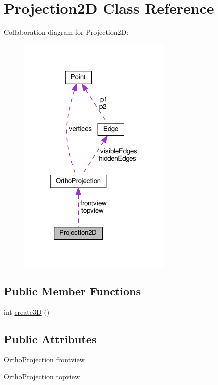 \hypertarget{class_projection2_d}{}\section{Projection2D Class Reference}
\label{class_projection2_d}


Collaboration diagram for Projection2D\+:
\nopagebreak
\begin{figure}[H]
\begin{center}
\leavevmode
\includegraphics[width=211pt]{class_projection2_d__coll__graph}
\end{center}
\end{figure}
\subsection*{Public Member Functions}
\begin{DoxyCompactItemize}
\item 
int \hyperlink{class_projection2_d_a02e2cbca6d928a05400597693cbb6a08}{create3D} ()
\end{DoxyCompactItemize}
\subsection*{Public Attributes}
\begin{DoxyCompactItemize}
\item 
\hyperlink{class_ortho_projection}{Ortho\+Projection} \hyperlink{class_projection2_d_a1eb4d010190b1bd62bf0f9c4e4afc88a}{frontview}
\item 
\hyperlink{class_ortho_projection}{Ortho\+Projection} \hyperlink{class_projection2_d_a90079954379a766f60ba01ad393327ab}{topview}
\end{DoxyCompactItemize}
